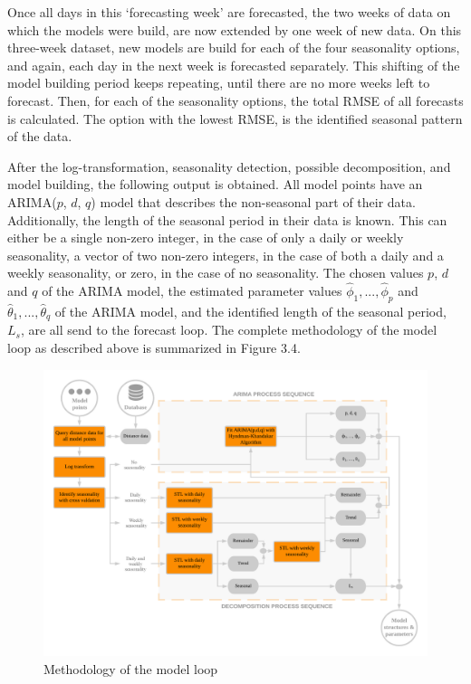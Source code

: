 \documentclass[12pt,oneside]{reedthesis}
\begin{document}
Once all days in this `forecasting week' are forecasted, the two weeks
of data on which the models were build, are now extended by one week of
new data. On this three-week dataset, new models are build for each of
the four seasonality options, and again, each day in the next week is
forecasted separately. This shifting of the model building period keeps
repeating, until there are no more weeks left to forecast. Then, for
each of the seasonality options, the total RMSE of all forecasts is
calculated. The option with the lowest RMSE, is the identified seasonal
pattern of the data.

After the log-transformation, seasonality detection, possible
decomposition, and model building, the following output is obtained. All
model points have an ARIMA(\(p\), \(d\), \(q\)) model that describes the
non-seasonal part of their data. Additionally, the length of the
seasonal period in their data is known. This can either be a single
non-zero integer, in the case of only a daily or weekly seasonality, a
vector of two non-zero integers, in the case of both a daily and a
weekly seasonality, or zero, in the case of no seasonality. The chosen
values \(p\), \(d\) and \(q\) of the ARIMA model, the estimated
parameter values \(\hat\phi_{1},...,\hat\phi_{p}\) and
\(\hat\theta_{1},...,\hat\theta_{q}\) of the ARIMA model, and the
identified length of the seasonal period, \(L_{s}\), are all send to the
forecast loop. The complete methodology of the model loop as described
above is summarized in Figure 3.4.
\begin{figure}[H]
\includegraphics[width=\textwidth]{Figures/Modelloop} \caption{Methodology of the model loop}\label{fig:modelloop}
\end{figure}
\end{document}

